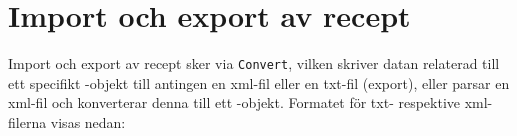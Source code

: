 \section{Import och export av recept}
Import och export av recept sker via \verb=Convert=, vilken skriver datan relaterad till ett specifikt \Recipe-objekt till antingen en xml-fil eller en txt-fil (export), eller parsar en xml-fil och konverterar denna till ett \Recipe-objekt. Formatet för txt- respektive xml-filerna visas nedan:







